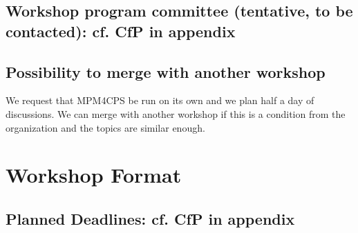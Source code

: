 \subsection{Workshop program committee (tentative, to be contacted): cf. CfP in appendix}

\subsection{Possibility to merge with another workshop}
We request that MPM4CPS be run on its own and we plan half a day of discussions.
We can merge with another workshop if this is a condition from the organization 
and the topics are similar enough.

\section{Workshop Format}
\subsection{Planned Deadlines: cf. CfP in appendix}

